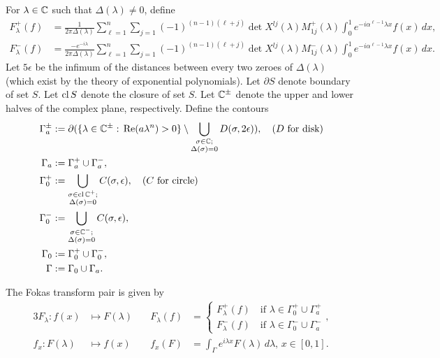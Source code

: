 \documentclass[11pt, oneside, a4paper]{article}
\begin{document}
For $\lambda\in\mathbb C$ such that $\Delta(\lambda)\neq 0$, define
\begin{align*}
    F^+_\lambda(f) &= \frac{1}{2\pi \Delta(\lambda)} \sum_{\ell=1}^n\sum_{j=1}(-1)^{(n-1)(\ell+j)}\det X^{lj}(\lambda)M^+_{1j}(\lambda)\int_0^1 e^{-i\alpha^{\ell-1}\lambda x}f(x)\,dx,\\
    F^-_\lambda(f) &= \frac{-e^{-i\lambda}}{2\pi \Delta(\lambda)} \sum_{\ell=1}^n\sum_{j=1}(-1)^{(n-1)(\ell+j)}\det X^{lj}(\lambda)M^-_{1j}(\lambda)\int_0^1 e^{-i\alpha^{\ell-1}\lambda x}f(x)\,dx.
\end{align*}
Let $5\epsilon$ be the infimum of the distances between every two zeroes of $\Delta(\lambda)$ (which exist by the theory of exponential polynomials\cite{Langer1930}). Let $\partial S$ denote boundary of set $S$. Let $\operatorname{cl}{S}$ denote the closure of set $S$. Let $\mathbb C^\pm$ denote the upper and lower halves of the complex plane, respectively. Define the contours
\begin{align*}
    \Gamma_a^{\pm} &:= \partial(\{\lambda\in\mathbb C^{\pm}:\, \mathrm{Re}(a\lambda^n)>0\}\setminus \bigcup_{\substack{\sigma\in\mathbb C;\\\Delta(\sigma)=0}} D(\sigma, 2\epsilon)),\quad\mbox{($D$ for disk)}\\
    \Gamma_a &:= \Gamma_a^+\cup \Gamma_a^-,\\
    \Gamma_0^+ &:= \bigcup_{\substack{\sigma\in\operatorname{cl}\mathbb C^+;\\ \Delta(\sigma)=0}} C(\sigma, \epsilon),\quad\mbox{($C$ for circle)}\\
    \Gamma_0^- &:= \bigcup_{\substack{\sigma\in\mathbb C^-;\\ \Delta(\sigma)=0}} C(\sigma, \epsilon),\\
    \Gamma_0 &:= \Gamma_0^+\cup \Gamma_0^-,\\
    \Gamma &:= \Gamma_0\cup \Gamma_a.
\end{align*}

The Fokas transform pair is given by
\begin{alignat*}{3}
F_\lambda: f(x)&\mapsto F(\lambda)\quad &F_\lambda(f) &= \begin{cases}F^+_\lambda(f)\quad\mbox{if $\lambda\in \Gamma_0^+\cup \Gamma_a^+$}\\F^-_\lambda(f)\quad\mbox{if $\lambda\in \Gamma_0^-\cup \Gamma_a^-$}\end{cases},\\
f_x:F(\lambda)&\mapsto f(x)\quad &f_x(F) &= \int_\Gamma e^{i\lambda x} F(\lambda)\,d\lambda,\, x\in [0,1].
\end{alignat*}
\end{document}
